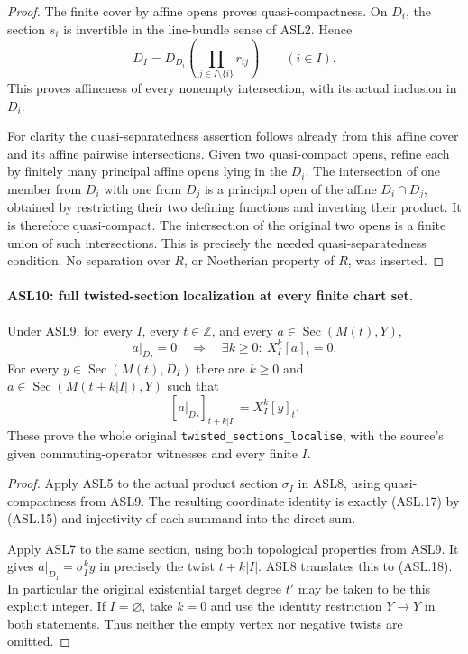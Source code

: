 \begin{proof}
The finite cover by affine opens proves quasi-compactness.
On $D_i$, the section $s_i$ is invertible in the line-bundle
sense of ASL2.  Hence
\[
 D_I=D_{D_i}\left(\prod_{j\in I\setminus\{i\}}r_{ij}\right)
                       \qquad(i\in I).                \tag{ASL.16}
\]
This proves affineness of every nonempty intersection, with its
actual inclusion in $D_i$.

For clarity the quasi-separatedness assertion follows already
from this affine cover and its affine pairwise intersections.
Given two quasi-compact opens, refine each by finitely many
principal affine opens lying in the $D_i$.  The intersection of
one member from $D_i$ with one from $D_j$ is a principal open
of the affine $D_i\cap D_j$, obtained by restricting their two
defining functions and inverting their product.  It is therefore
quasi-compact.  The intersection of the original two opens is a
finite union of such intersections.  This is precisely the needed
quasi-separatedness condition.  No separation over $R$, or
Noetherian property of $R$, was inserted.
\end{proof}

\paragraph{ASL10: full twisted-section localization at every finite chart set.}
\label{claim:ASL10}
Under ASL9, for every $I$, every $t\in\mathbb Z$, and every
$a\in\operatorname{Sec}(M(t),Y)$,
\[
 a|_{D_I}=0\quad\Longrightarrow\quad
       \exists k\ge0:\ X_I^k[a]_t=0.                 \tag{ASL.17}
\]
For every $y\in\operatorname{Sec}(M(t),D_I)$ there are
$k\ge0$ and $a\in\operatorname{Sec}(M(t+k|I|),Y)$ such that
\[
             [a|_{D_I}]_{t+k|I|}=X_I^k[y]_t.         \tag{ASL.18}
\]
These prove the whole original
\texttt{twisted\_\allowbreak{}sections\_\allowbreak{}localise}, with the source's given
commuting-operator witnesses and every finite $I$.

\begin{proof}
Apply ASL5 to the actual product section $\sigma_I$ in ASL8,
using quasi-compactness from ASL9.  The resulting coordinate
identity is exactly (ASL.17) by (ASL.15) and injectivity of each
summand into the direct sum.

Apply ASL7 to the same section, using both topological properties
from ASL9.  It gives $a|_{D_I}=\sigma_I^ky$ in precisely the
twist $t+k|I|$.  ASL8 translates this to (ASL.18).  In
particular the original existential target degree $t'$ may be
taken to be this explicit integer.  If $I=\varnothing$, take
$k=0$ and use the identity restriction $Y\to Y$ in both statements.
Thus neither the empty vertex nor negative twists are omitted.
\end{proof}

